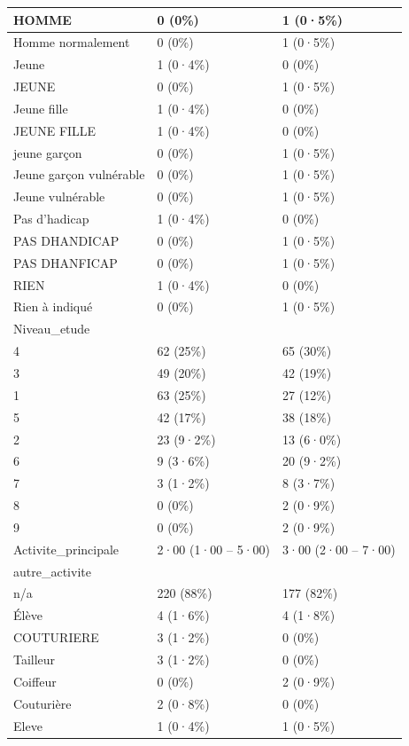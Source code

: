 \documentclass[
]{book}
\begin{document}
\begin{tabular}{l|l|l}
\hline
HOMME & 0 (0\%) & 1 (0·5\%)\\
\hline
Homme normalement & 0 (0\%) & 1 (0·5\%)\\
\hline
Jeune & 1 (0·4\%) & 0 (0\%)\\
\hline
JEUNE & 0 (0\%) & 1 (0·5\%)\\
\hline
Jeune fille & 1 (0·4\%) & 0 (0\%)\\
\hline
JEUNE FILLE & 1 (0·4\%) & 0 (0\%)\\
\hline
jeune garçon & 0 (0\%) & 1 (0·5\%)\\
\hline
Jeune garçon vulnérable & 0 (0\%) & 1 (0·5\%)\\
\hline
Jeune vulnérable & 0 (0\%) & 1 (0·5\%)\\
\hline
Pas d'hadicap & 1 (0·4\%) & 0 (0\%)\\
\hline
PAS DHANDICAP & 0 (0\%) & 1 (0·5\%)\\
\hline
PAS DHANFICAP & 0 (0\%) & 1 (0·5\%)\\
\hline
RIEN & 1 (0·4\%) & 0 (0\%)\\
\hline
Rien à indiqué & 0 (0\%) & 1 (0·5\%)\\
\hline
Niveau\_etude &  & \\
\hline
4 & 62 (25\%) & 65 (30\%)\\
\hline
3 & 49 (20\%) & 42 (19\%)\\
\hline
1 & 63 (25\%) & 27 (12\%)\\
\hline
5 & 42 (17\%) & 38 (18\%)\\
\hline
2 & 23 (9·2\%) & 13 (6·0\%)\\
\hline
6 & 9 (3·6\%) & 20 (9·2\%)\\
\hline
7 & 3 (1·2\%) & 8 (3·7\%)\\
\hline
8 & 0 (0\%) & 2 (0·9\%)\\
\hline
9 & 0 (0\%) & 2 (0·9\%)\\
\hline
Activite\_principale & 2·00 (1·00 – 5·00) & 3·00 (2·00 – 7·00)\\
\hline
autre\_activite &  & \\
\hline
n/a & 220 (88\%) & 177 (82\%)\\
\hline
Élève & 4 (1·6\%) & 4 (1·8\%)\\
\hline
COUTURIERE & 3 (1·2\%) & 0 (0\%)\\
\hline
Tailleur & 3 (1·2\%) & 0 (0\%)\\
\hline
Coiffeur & 0 (0\%) & 2 (0·9\%)\\
\hline
Couturière & 2 (0·8\%) & 0 (0\%)\\
\hline
Eleve & 1 (0·4\%) & 1 (0·5\%)\\

\end{tabular}
\end{document}
